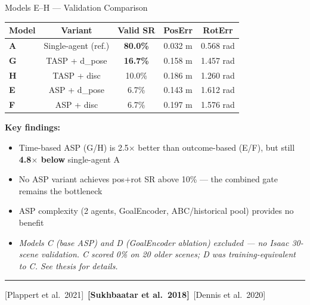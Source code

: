 \documentclass[aspectratio=169,xcolor=dvipsnames,t]{beamer}
\newcommand{\litfooter}[1]{%
  \vspace{2pt}%
  \hrule%
  \vspace{2pt}%
  {\tiny\color{LightDarkGrey} #1}%
}
\begin{document}

\begin{frame}[t]{Models E–H — Validation Comparison}
  \begin{center}
  \begin{tabular}{lcccc}
    \toprule
    \textbf{Model} & \textbf{Variant} & \textbf{Valid SR} & \textbf{PosErr} & \textbf{RotErr} \\
    \midrule
    \rowcolor{hlgreen!15}
    \textbf{A} & Single-agent (ref.) & \textbf{80.0\%} & 0.032 m & 0.568 rad \\
    \midrule
    \textbf{G} & TASP + d\_pose & \textbf{16.7\%} & 0.158 m & 1.457 rad \\
    \textbf{H} & TASP + disc & 10.0\% & 0.186 m & 1.260 rad \\
    \textbf{E} & ASP + d\_pose & 6.7\% & 0.143 m & 1.612 rad \\
    \textbf{F} & ASP + disc & 6.7\% & 0.197 m & 1.576 rad \\
    \bottomrule
  \end{tabular}
  \end{center}

  \vspace{4pt}
  {\small \textbf{Key findings:}}
  \begin{itemize}
    \item Time-based ASP (G/H) is 2.5$\times$ better than outcome-based (E/F), but still \textbf{4.8$\times$ below} single-agent A
    \item No ASP variant achieves pos+rot SR above 10\% — the combined gate remains the bottleneck
    \item ASP complexity (2 agents, GoalEncoder, ABC/historical pool) provides no benefit
    \item \textit{Models C (base ASP) and D (GoalEncoder ablation) excluded — no Isaac 30-scene validation. C scored 0\% on 20 older scenes; D was training-equivalent to C. See thesis for details.}
  \end{itemize}

  \vfill\litfooter{[Plappert et al.\ 2021]~\textbf{[Sukhbaatar et al.\ 2018]}~[Dennis et al.\ 2020]}
\end{frame}
\end{document}
